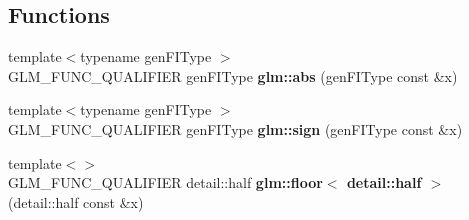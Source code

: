\subsection*{Functions}
\begin{DoxyCompactItemize}
\item 
\hypertarget{namespaceglm_a5c82b1e2a9cb12b4a70d22a8f987273d}{}{\footnotesize template$<$typename gen\+F\+I\+Type $>$ }\\G\+L\+M\+\_\+\+F\+U\+N\+C\+\_\+\+Q\+U\+A\+L\+I\+F\+I\+E\+R gen\+F\+I\+Type {\bfseries glm\+::abs} (gen\+F\+I\+Type const \&x)\label{namespaceglm_a5c82b1e2a9cb12b4a70d22a8f987273d}

\item 
\hypertarget{namespaceglm_aaa1babcfcb872aa6bf5e701c20ac4fda}{}{\footnotesize template$<$typename gen\+F\+I\+Type $>$ }\\G\+L\+M\+\_\+\+F\+U\+N\+C\+\_\+\+Q\+U\+A\+L\+I\+F\+I\+E\+R gen\+F\+I\+Type {\bfseries glm\+::sign} (gen\+F\+I\+Type const \&x)\label{namespaceglm_aaa1babcfcb872aa6bf5e701c20ac4fda}

\item 
\hypertarget{namespaceglm_ad87110896994fda992155f8ee13ca1ee}{}{\footnotesize template$<$$>$ }\\G\+L\+M\+\_\+\+F\+U\+N\+C\+\_\+\+Q\+U\+A\+L\+I\+F\+I\+E\+R detail\+::half {\bfseries glm\+::floor$<$ detail\+::half $>$} (detail\+::half const \&x)\label{namespaceglm_ad87110896994fda992155f8ee13ca1ee}


\end{DoxyCompactItemize}
